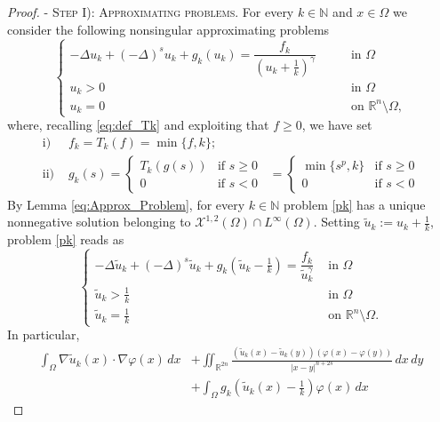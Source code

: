 \documentclass[11pt,a4paper]{amsart}
\def \N {\mathbb{N}}
\def \R {\mathbb{R}}
\def \XX {\mathcal{X}}
\theoremstyle{definition}
\theoremstyle{plain}
\numberwithin{equation}{section}
\begin{document}
{\begin{proof}
-\,\,\textsc{Step I): Approximating problems.} For every $k\in \mathbb{N}$ and $x\in\Omega$ we consider the following nonsingular approximating problems 
\begin{equation}\label{pk}
\left\{
\begin{array}{ll}
-\Delta u_k+(-\Delta)^s u_k +g_k(u_k)=\dfrac{f_k}{(u_k+\frac{1}{k})^{\gamma}}\qquad& \mbox{in }\Omega
\\
u_k>0& \mbox{in }\Omega
\\
u_k=0& \mbox{on }\mathbb{R}^n\setminus\Omega,
\end{array}
\right.
\end{equation}
where, recalling \eqref{eq:def_Tk} and exploiting that $f\geq 0$, we have set
\begin{align*}
	\mathrm{i)}\,\,&f_k= T_{k}(f) = \min\{f,k\}; \\
	\mathrm{ii)}\,\,&
	g_{k}(s)= \begin{cases}
		T_{k}(g(s)) & \text{if $s\geq 0$}\\
		0 & \text{if $s < 0$}
	\end{cases} 
	\,\,\,= \begin{cases}
		\min\{s^p,k\} & \text{if $s\geq 0$} \\
		0 & \text{if $s < 0$}
	\end{cases}
\end{align*}
By Lemma \ref{eq:Approx_Problem}, for every $k \in \N$ problem \eqref{pk} has a unique nonnegative solution belonging to $\XX^{1,2}(\Omega)\cap L^{\infty}(\Omega)$. Setting $\tilde u_k:=u_k+\frac{1}{k}$, problem \eqref{pk} reads as
\begin{equation*}
\begin{cases}-\Delta \tilde{u}_{k}+(-\Delta)^s\tilde u_k+g_k\left(\tilde u_k-\frac 1 k\right)=\dfrac{f_k}{\tilde{u}_{k}^{\gamma}} & \text { in } \Omega  \\ \tilde{u}_{k}>\frac{1}{k} & \text { in } \Omega \\ \tilde{u}_{k}=\frac{1}{k} & \text { on } \R^n\setminus \Omega .\end{cases}
\end{equation*}
In particular,
\begin{equation}\label{weakapprox}
\begin{split}
\int_\Omega\nabla \tilde u_k(x)\cdot\nabla\varphi(x)\,dx&+\iint_{\R^{2n}}\frac{(\tilde u_k(x)-\tilde u_k(y))(\varphi(x)-\varphi(y))}{|x-y|^{n+2s}}\,dx\,dy\\&+\int_\Omega g_k\left(\tilde u_k(x)-\frac 1 k\right)\varphi(x) \,dx

\end{split}
\end{equation}
\end{proof}}
\end{document}
